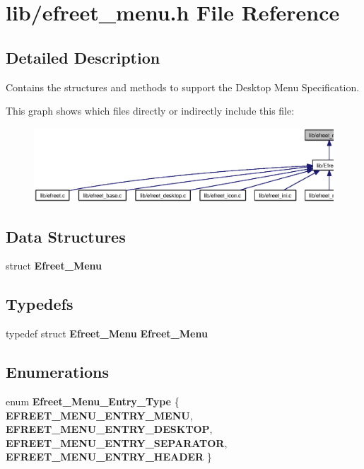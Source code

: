 \section{lib/efreet\_\-menu.h File Reference}
\label{efreet__menu_8h}


\subsection{Detailed Description}
Contains the structures and methods to support the Desktop Menu Specification. 





This graph shows which files directly or indirectly include this file:\nopagebreak
\begin{figure}[H]
\begin{center}
\leavevmode
\includegraphics[width=420pt]{efreet__menu_8h__dep__incl}
\end{center}
\end{figure}
\subsection*{Data Structures}
\begin{CompactItemize}
\item 
struct {\bf Efreet\_\-Menu}
\end{CompactItemize}
\subsection*{Typedefs}
\begin{CompactItemize}
\item 
typedef struct {\bf Efreet\_\-Menu} {\bf Efreet\_\-Menu}
\end{CompactItemize}
\subsection*{Enumerations}
\begin{CompactItemize}
\item 
enum {\bf Efreet\_\-Menu\_\-Entry\_\-Type} \{ {\bf EFREET\_\-MENU\_\-ENTRY\_\-MENU}, 
{\bf EFREET\_\-MENU\_\-ENTRY\_\-DESKTOP}, 
{\bf EFREET\_\-MENU\_\-ENTRY\_\-SEPARATOR}, 
{\bf EFREET\_\-MENU\_\-ENTRY\_\-HEADER}
 \}
\end{CompactItemize}
